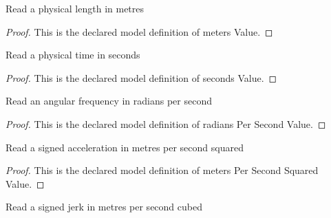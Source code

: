 \begin{definition}
  \label{def:physics:phyx-mini-0277:phyxminiproblems-problemphyxmini0277-metersvalue}
  Read a physical length in metres
\end{definition}
\begin{proof}
  This is the declared model definition of meters Value.
\end{proof}
\begin{definition}
  \label{def:physics:phyx-mini-0277:phyxminiproblems-problemphyxmini0277-secondsvalue}
  Read a physical time in seconds
\end{definition}
\begin{proof}
  This is the declared model definition of seconds Value.
\end{proof}
\begin{definition}
  \label{def:physics:phyx-mini-0277:phyxminiproblems-problemphyxmini0277-radianspersecondvalue}
  Read an angular frequency in radians per second
\end{definition}
\begin{proof}
  This is the declared model definition of radians Per Second Value.
\end{proof}
\begin{definition}
  \label{def:physics:phyx-mini-0277:phyxminiproblems-problemphyxmini0277-meterspersecondsquaredvalue}
  Read a signed acceleration in metres per second squared
\end{definition}
\begin{proof}
  This is the declared model definition of meters Per Second Squared Value.
\end{proof}
\begin{definition}
  \label{def:physics:phyx-mini-0277:phyxminiproblems-problemphyxmini0277-meterspersecondcubedvalue}
  Read a signed jerk in metres per second cubed
\end{definition}
